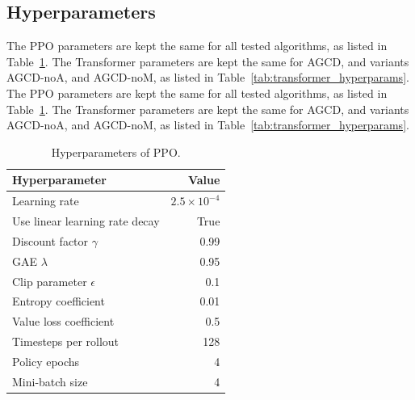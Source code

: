 \documentclass{article}
\begin{document}
    \subsection{Hyperparameters}
    The PPO parameters are kept the same for all tested algorithms, as listed in
    Table~\ref{tab:ppo_hyperparams}. The Transformer parameters are kept the same
    for AGCD, and variants AGCD-noA, and AGCD-noM, as listed in Table~\ref{tab:transformer_hyperparams}.
    The PPO parameters are kept the same for all tested algorithms, as listed in
    Table~\ref{tab:ppo_hyperparams}. The Transformer parameters are kept the same
    for AGCD, and variants AGCD-noA, and AGCD-noM, as listed in Table~\ref{tab:transformer_hyperparams}.
    \label{subsec:hyperparameters} \captionsetup{hypcap=false}
    \begin{table}[H]
        \centering
        \caption{Hyperparameters of PPO.}
        \label{tab:ppo_hyperparams}
        \begin{tabular}{lr}
            \toprule \textbf{Hyperparameter} & \textbf{Value}       \\
            \midrule Learning rate           & $2.5 \times 10^{-4}$ \\
            Use linear learning rate decay   & True                 \\
            Discount factor $\gamma$         & 0.99                 \\
            GAE $\lambda$                    & 0.95                 \\
            Clip parameter $\epsilon$        & 0.1                  \\
            Entropy coefficient              & 0.01                 \\
            Value loss coefficient           & 0.5                  \\
            Timesteps per rollout            & 128                  \\
            Policy epochs                    & 4                    \\
            Mini-batch size                  & 4                    \\
            \bottomrule
        \end{tabular}
    \end{table}
\end{document}
